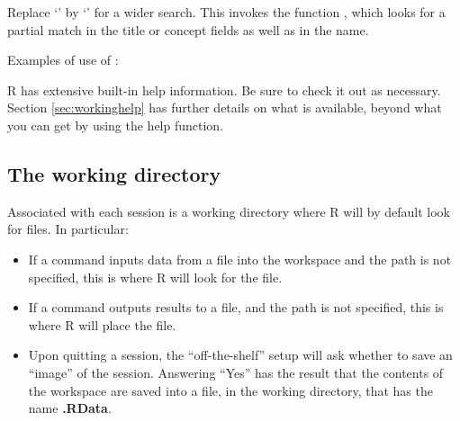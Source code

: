 Replace `' by `' for a wider search.  This invokes
the function , which looks for a partial match
in the title or concept fields as well as in the name.
\begin{marginfigure}[-15pt]
Examples of use of :\\[-5pt]
\begin{knitrout}
\color{fgcolor}\begin{kframe}
\begin{alltt}
\hlopt{::}
\end{alltt}
\end{kframe}
\end{knitrout}
\end{marginfigure}

R has extensive built-in help information.  Be sure to check it out
as necessary.  Section \ref{sec:workinghelp} has further details on
what is available, beyond what you can get by using the help function.

\subsection{The working directory}\label{ss:workdir}

Associated with each session 
is a working directory where R will by default look
for files.  In particular:
\begin{itemize}
\item If a command inputs data from a file into the
workspace and the path is not specified, this is where R
will look for the file.
\item If a command outputs results to a file, and the path is not specified,
this is where R will place the file.
\item Upon quitting a session, the ``off-the-shelf'' setup will ask
  whether to save an ``image'' of the session. 
  Answering
  ``Yes'' has the result that the contents of the workspace are saved
  into a file, in the working directory, that has the name {\bf
    .RData}.  
\end{itemize}

